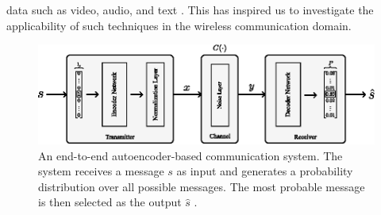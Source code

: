 data such as video, audio, and text \cite{martin2023evolving}. This has inspired us to investigate the applicability of such techniques in the wireless communication domain.

\begin{figure}[tp!]
	\center
	\includegraphics[width=0.9\linewidth]{figs/original_autoencoder_architecture.eps}
	\caption{An end-to-end autoencoder-based communication system. The system receives a message \(s\) as input and generates a probability distribution over all possible messages. The most probable message is then selected as the output \(\hat{s}\) \cite{o2017introduction}.}	
	\label{fig:original_autoencoder_architecture}
\end{figure}

